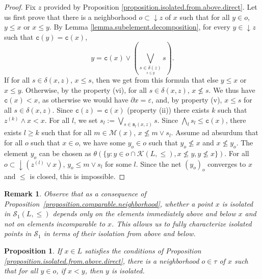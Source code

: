 \documentclass{article}
\newtheorem{proposition}[theorem]{Proposition}
\newtheorem{remark}[theorem]{Remark}
\begin{document}
\begin{proof}
        Fix $z$ provided by Proposition \ref{proposition.isolated.from.above.direct}. Let us first prove that there is a neighborhood $o \subset \mathop{\downarrow}z$ of $x$ such that for all $y \in o$, $y \le x$ or $x \le y$. 
    By Lemma \ref{lemma.subelement.decomposition}, for every $y \in \mathop{\downarrow}z$ such that $\texttt{c}(y) = \texttt{c}(x)$, 
    \[y = \texttt{c}(x) \vee \left(\bigvee_{\underset{s \le y}{s \in \delta(z)}} s \right).\]
    If for all $s \in \delta(x,z)$, $x \le s$, then 
    we get from this formula that else $y \le x$ or $x \le y$. Otherwise, by the property (vi), for all $s \in \delta(x,z)$, $x \not \le s$. We thus have $\texttt{c}(x) < x$, as otherwise we would have $\partial x = \varepsilon$, and, by property (v), $x \le s$ for all $s \in \delta(x,z)$.
    Since $\texttt{c}(z) = \texttt{c}(x)$ (property (ii)) there exists $k$ such that $z^{(k)} \wedge x < x$. For all $l$, 
    we set $s_l := \bigvee_{s \in \texttt{s}_l(x,z)} s$. Since $\bigwedge_l s_l \le \texttt{c}(x)$, there exists $l \ge k$ such that for all $m \in \mathcal{M}(x)$, $x \not \le m \vee s_l$. Assume ad absurdum that for all $o$ such that $x \in o$, we have some $y_o \in o$ such that $y_o \not \le x$ and $x \not \le y_o$. The element $y_o$ can be chosen as $\theta(\{y : y \in o \cap \mathcal{K}(L,\le) , x \not \le y , y \not \le x\})$. For all $o \subset \mathop{\downarrow}(z^{(l)}\vee x)$, $y_o \le m \vee s_l$ for some $l$. 
    Since the net $(y_o)_o$ converges to $x$ and $\le$ is closed, this is impossible. 
\end{proof}
{
\begin{remark}
Observe that as a consequence of Proposition~\ref{proposition.comparable.neighborhood}, whether a point \(x\) is isolated in \(\mathcal{S}_1(L,\leq)\) depends only on the elements immediately above and below \(x\) and not on elements incomparable to \(x\). This allows us to fully characterize isolated points in \(\mathcal{S}_1\) in terms of their isolation from above and below. 
\end{remark}
}
\begin{proposition}\label{proposition.reverse.from.above}
    If $x \in L$ satisfies the conditions of Proposition \ref{proposition.isolated.from.above.direct}, there is a neighborhood $o\in \tau$ of $x$ such that 
    for all $y \in o$, if $x < y$, then $y$ is isolated.
\end{proposition}
\end{document}
